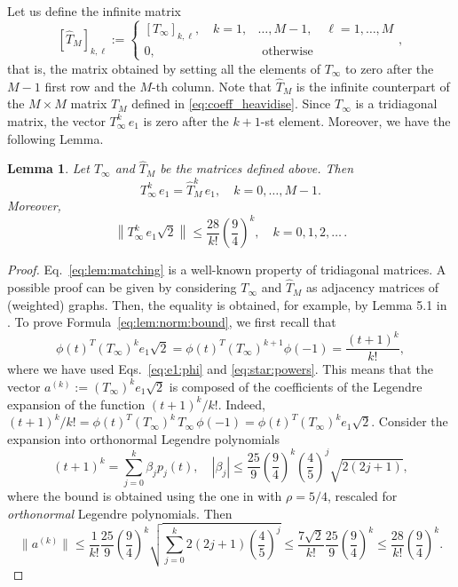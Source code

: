 \documentclass[final,1p,times,number]{elsarticle}
\theoremstyle{plain}%
\newtheorem{lem}[thm]{Lemma}
\begin{document}
Let us define the infinite matrix
\begin{equation}\label{eq:T_hatm}
[\hat{T}_{M}]_{k,\ell} := \left \{ \begin{array}{ll}
  [T_{\infty}]_{k,\ell}, \quad k=1, & \dots,M-1, \quad  \ell = 1, \dots, M \\
   0,  & \text{ otherwise } 
\end{array} \right. ,   
\end{equation}
 that is, the matrix obtained by setting all the elements of $T_\infty$ to zero after the $M-1$ first row and the $M$-th column. Note that \(\hat{T}_M\) is the infinite counterpart of the $M \times M$ matrix \(T_M\) defined in \eqref{eq:coeff_heavidise}. 
Since $T_\infty$ is a tridiagonal matrix, the vector $T_\infty^k\, e_1$ is zero after the $k+1$-st element. Moreover, we have the following Lemma.
\begin{lem}\label{lem:tridiag}
Let $T_\infty$ and $\hat{T}_{M}$ be the matrices defined above. Then
\begin{equation}\label{eq:lem:matching}
     T_\infty^k\, e_1 =  \hat{T}_{M}^k\, e_1, \quad k = 0, \dots, M-1.
\end{equation}
Moreover,
\begin{equation}\label{eq:lem:norm:bound}
   \left\| T_\infty^k\, e_1 \sqrt{2} \right\| \leq \frac{28}{k!} \left( \frac{9}{4} \right)^k, \quad k=0, 1, 2, \dots \,.
\end{equation}
\end{lem}
\begin{proof}
Eq.~\eqref{eq:lem:matching} is a well-known property of tridiagonal matrices. A possible proof can be given by considering $T_\infty$ and $\hat{T}_{M}$ as adjacency matrices of (weighted) graphs. Then, the equality is obtained, for example, by Lemma 5.1 in \cite{PozTud18}.
To prove Formula~\eqref{eq:lem:norm:bound}, we first recall that 
\[ \phi(t)^T(T_\infty)^k e_1 \sqrt{2} = \phi(t)^T (T_\infty)^{k+1} \phi(-1) = \frac{(t+1)^k}{k!}, \]
where we have used Eqs.~\eqref{eq:e1:phi} and \eqref{eq:star:powers}. This means that the vector
\(a^{(k)} := (T_\infty)^k e_1 \sqrt{2} \) is composed of the coefficients of the Legendre expansion of the function \((t+1)^k/k!\). Indeed, \((t+1)^k/k! = \phi(t)^T (T_\infty)^k \, T_\infty \, \phi(-1) = \phi(t)^T (T_\infty)^k e_1 \sqrt{2}\).
Consider the expansion into orthonormal Legendre polynomials
\[ (t+1)^{k} = \sum_{j=0}^k \beta_j p_j(t), \quad |\beta_j| \leq \frac{25}{9}\left( \frac{9}{4} \right)^k \left( \frac{4}{5} \right)^j \sqrt{2(2j + 1)},  \]
where the bound is obtained using  the one in \cite[Formula (2.2)]{wang} with $\rho=5/4$, rescaled for \emph{orthonormal} Legendre polynomials. Then
\[\| a^{(k)} \| \leq \frac{1}{k!} \frac{25}{9}\left( \frac{9}{4} \right)^k \sqrt{\sum_{j=0}^k 2(2j + 1) \left(\frac{4}{5}\right)^j} \leq \frac{7\sqrt{2}}{k!} \frac{25}{9} \left( \frac{9}{4} \right)^k  \leq  \frac{28}{k!} \left( \frac{9}{4} \right)^k.  \]
\end{proof}
\end{document}
